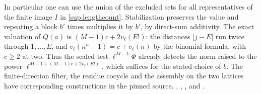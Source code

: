 In particular one can use the union of the excluded sets for all
representatives of the finite image \(I\) in \eqref{sup:lengthcount}.
Stabilization preserves the value and repeating a block \(b'\) times
multiplies it by \(b'\), by direct-sum additivity. The exact valuation of \(Q(a)\) is
\((M-1)c+2v_\ell(E!)\): the distances \(|j-E|\) run twice through
\(1,\ldots,E\), and \(v_\ell(\kappa^n-1)=c+v_\ell(n)\) by the
binomial formula, with \(c\ge2\) at two. Thus the scaled test
\(\ell^{M-1}\Phi\) already detects the norm raised to the power
\(\ell^{M-1+(M-1)c+2v_\ell(E!)}\), which suffices for the stated
choice of \(b\). The finite-direction filter, the residue cocycle
and the assembly on the two lattices have corresponding constructions
in the pinned source.
,
,
, and
.
